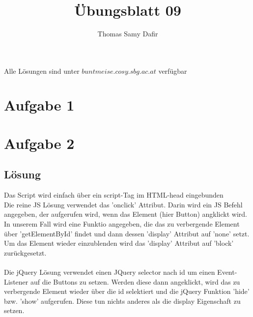 \documentclass[12pt, a4paper]{report}
\title{Übungsblatt 09}
\author{Thomas Samy Dafir}
\date{}
\begin{document}
\maketitle

Alle Lösungen sind unter $buntmeise.cosy.sbg.ac.at$ verfügbar
\section*{Aufgabe 1}

\section*{Aufgabe 2}
\subsection*{Lösung}
Das Script wird einfach über ein script-Tag im HTML-head eingebunden\\
Die reine JS Lösung verwendet das 'onclick' Attribut. Darin wird ein JS Befehl angegeben, der aufgerufen wird,
wenn das Element (hier Button) angklickt wird.\\
In unserem Fall wird eine Funktio angegeben, die das zu verbergende Element über 'getElementById' findet und dann dessen
'display' Attribut auf 'none' setzt. Um das Element wieder einzublenden wird das 'display' Attribut auf 'block' zurückgesetzt.\\
\\
Die jQuery Lösung verwendet einen JQuery selector nach id um einen Event-Listener auf die Buttons zu setzen. Werden diese dann
angeklickt, wird das zu verbergende Element wieder über die id selektiert und die jQuery Funktion 'hide' bzw. 'show' aufgerufen.
Diese tun nichts anderes als die display Eigenschaft zu setzen.
\end{document}
